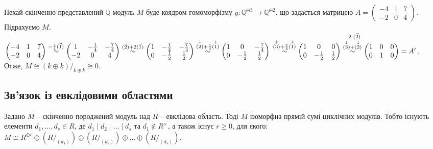 \documentclass{math_library}
\begin{document}
\begin{example}
Нехай скінченно представлений $\mathbb{Q}$-модуль $M$ буде коядром гомоморфізму $g \colon \mathbb{Q}^{\oplus 3} \to \mathbb{Q}^{\oplus 2}$, що задається матрицею $A = \begin{pmatrix}
-4 & 1 & 7 \\
-2 & 0 & 4
\end{pmatrix}$. Підрахуємо $M$.\\
$\begin{pmatrix}
-4 & 1 & 7 \\
-2 & 0 & 4
\end{pmatrix} \overset{\substack{-\frac{1}{4} \vec{(1)}}}{\sim} \begin{pmatrix}
1 & -\frac{1}{4} & -\frac{7}{4} \\
-2 & 0 & 4
\end{pmatrix} \overset{\vec{(2)} + 2 \vec{(1)}}{\sim} \begin{pmatrix}
1 & -\frac{1}{4} & -\frac{7}{4} \\
0 & -\frac{1}{2} & \frac{1}{2}
\end{pmatrix} \overset{\substack{ \overset{\downarrow}{(2)} + \frac{1}{4}\overset{\downarrow}{(1)}}}{\sim} \begin{pmatrix}
1 & 0 & -\frac{7}{4} \\
0 & -\frac{1}{2} & \frac{1}{2}
\end{pmatrix} \\
\overset{\substack{\overset{\downarrow}{(3)} + \frac{7}{4} \overset{\downarrow}{(1)} }}{\sim} \begin{pmatrix}
1 & 0 & 0 \\
0 & -\frac{1}{2} & \frac{1}{2}
\end{pmatrix} \overset{\substack{\substack{-2 \cdot \vec{(2)} \\ \overset{\downarrow}{(3)} + \overset{\downarrow}{(2)}}}}{\sim} \begin{pmatrix}
1 & 0 & 0 \\
0 & 1 & 0
\end{pmatrix} = A'$.\\
Отже, $M \cong (k \oplus k)/_{k \oplus k} \cong 0$.
\end{example}

\subsection{Зв'язок із евклідовими областями}
\begin{theorem}
Задано $M$ -- скінченно породжений модуль над $R$ -- евклідова область. Тоді $M$ ізоморфна прямій сумі циклічних модулів. Тобто існують елементи $d_1,\dots,d_s \in R$, де $d_1 \mid d_2 \mid \dots \mid d_s$ та $d_1 \notin R^\times$, а також існує $r \geq 0$, для якого:\\
$M \cong R^{\oplus r} \oplus (R/_{(d_1)}) \oplus (R/_{(d_2)}) \oplus \dots \oplus (R/_{(d_s)})$.
\end{theorem}
\end{document}
